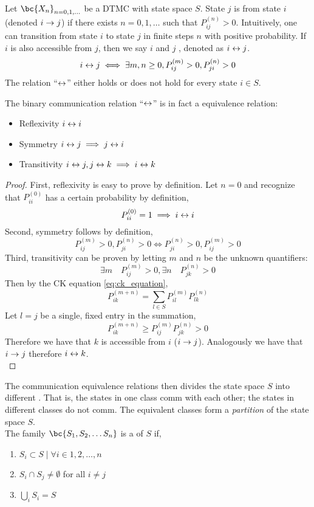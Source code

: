 \documentclass{article}
\begin{document}
Let $\bc{X_n}_{n=0,1,\ldots}$ be a DTMC with state space $S$. State $j$ is  from state $i$ (denoted $i \to j$) if there exists $n = 0, 1, \ldots$ such that $P^{(n)}_{ij} > 0$. Intuitively, one can transition from state $i$ to state $j$ in finite steps $n$ with positive probability. If $i$ is also accessible from $j$, then we say $i$ and $j$ , denoted as ${i}\leftrightarrow{j}$.
\[ {i}\leftrightarrow{j} \iff \exists m, n \geq 0, P_{ij}^{(m)} > 0, P_{ji}^{(n)} > 0 \]
The relation ``$\leftrightarrow$'' either holds or does not hold for every state $i \in S$.
\begin{theorem}
The binary communication relation ``${}{\leftrightarrow}$'' is in fact a equivalence relation:
\begin{itemize}
    \item Reflexivity ${i}\leftrightarrow{i}$
    \item Symmetry ${i}\leftrightarrow{j} \implies {j}\leftrightarrow{i}$
    \item Transitivity ${i}\leftrightarrow{j}, {j}\leftrightarrow{k} \implies {i}\leftrightarrow{k}$
\end{itemize}
\end{theorem}
\begin{proof}
First, reflexivity is easy to prove by definition. Let $n = 0$ and recognize that $P^{(0)}_{ii}$ has a certain probability by definition,
\[ P^{(0)}_{ii} = 1 \implies {i}\leftrightarrow{i} \]
Second, symmetry follows by definition,
\[ P_{ij}^{(m)} > 0, P_{ji}^{(n)} > 0 \Leftrightarrow P_{ji}^{(n)} > 0, P_{ij}^{(m)} > 0 \]
Third, transitivity can be proven by letting $m$ and $n$ be the unknown quantifiers:
\[ \exists m \quad P_{ij}^{(m)} > 0, \exists n \quad P_{jk}^{(n)} > 0 \]
Then by the CK equation \cref{eq:ck_equation},
\[ P^{(m+n)}_{ik} = \sum_{l \in S} P^{(m)}_{il}P^{(n)}_{lk} \]
Let $l = j$ be a single, fixed entry in the summation,
\[ P^{(m+n)}_{ik} \geq P^{(m)}_{ij}P^{(n)}_{jk} > 0 \]
Therefore we have that $k$ is accessible from $i$ ($i \to j$). Analogously we have that $i \to j$ therefore ${i}\leftrightarrow{k}$. \\
\end{proof}
The communication equivalence relations then divides the state space $S$ into different . That is, the states in one class comm with each other; the states in different classes do not comm. The equivalent classes form a \textit{partition} of the state space $S$. \\

The family $\bc{S_1, S_2, \ldots S_n}$ is a  of $S$ if,
\begin{enumerate}
    \item $S_i \subset S \mid \forall i \in 1,2,\ldots,n$
    \item $S_i \cap S_j \neq \emptyset$ for all $i \neq j$
    \item $\bigcup_{i} S_i = S$
\end{enumerate}
\end{document}
